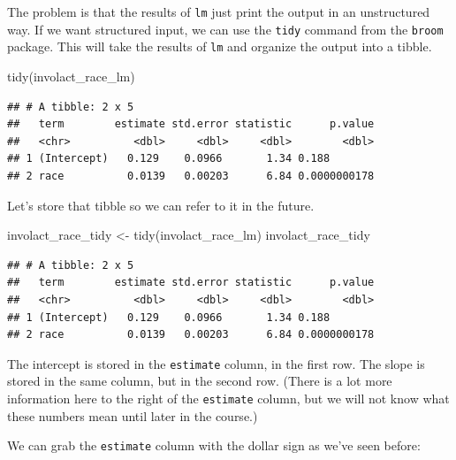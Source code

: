 \documentclass[
]{book}
\newenvironment{Shaded}{\begin{snugshade}}{\end{snugshade}}
\newcommand{\FunctionTok}[1]{\textcolor[rgb]{0.00,0.00,0.00}{#1}}
\newcommand{\NormalTok}[1]{#1}
\newcommand{\OtherTok}[1]{\textcolor[rgb]{0.56,0.35,0.01}{#1}}
\newcommand{\SpecialCharTok}[1]{\textcolor[rgb]{0.00,0.00,0.00}{#1}}
\begin{document}
The problem is that the results of \texttt{lm} just print the output in an unstructured way. If we want structured input, we can use the \texttt{tidy} command from the \texttt{broom} package. This will take the results of \texttt{lm} and organize the output into a tibble.

\begin{Shaded}
\begin{Highlighting}[]
\FunctionTok{tidy}\NormalTok{(involact\_race\_lm)}
\end{Highlighting}
\end{Shaded}

\begin{verbatim}
## # A tibble: 2 x 5
##   term        estimate std.error statistic      p.value
##   <chr>          <dbl>     <dbl>     <dbl>        <dbl>
## 1 (Intercept)   0.129    0.0966       1.34 0.188       
## 2 race          0.0139   0.00203      6.84 0.0000000178
\end{verbatim}

Let's store that tibble so we can refer to it in the future.

\begin{Shaded}
\begin{Highlighting}[]
\NormalTok{involact\_race\_tidy }\OtherTok{\textless{}{-}} \FunctionTok{tidy}\NormalTok{(involact\_race\_lm)}
\NormalTok{involact\_race\_tidy}
\end{Highlighting}
\end{Shaded}

\begin{verbatim}
## # A tibble: 2 x 5
##   term        estimate std.error statistic      p.value
##   <chr>          <dbl>     <dbl>     <dbl>        <dbl>
## 1 (Intercept)   0.129    0.0966       1.34 0.188       
## 2 race          0.0139   0.00203      6.84 0.0000000178
\end{verbatim}

The intercept is stored in the \texttt{estimate} column, in the first row. The slope is stored in the same column, but in the second row. (There is a lot more information here to the right of the \texttt{estimate} column, but we will not know what these numbers mean until later in the course.)

We can grab the \texttt{estimate} column with the dollar sign as we've seen before:

\begin{Shaded}
\end{Shaded}
\end{document}
